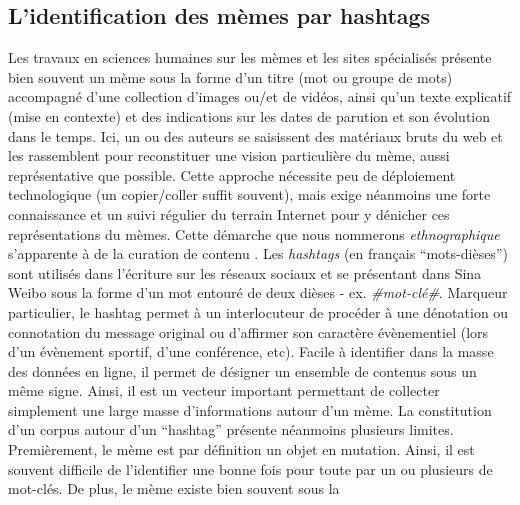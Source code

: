 \subsection[ L{\textquoteright}identification des m\`emes par hashtags ]{L{\textquoteright}identification des m\`emes par hashtags }
Les travaux en sciences humaines sur les m\`emes \citep{Bauckhage2011,
Coscia2013, Knobel2007} et les sites sp\'ecialis\'es \citep{Buchel2012, Bernstein2011} pr\'esente bien souvent un m\`eme sous la forme
d{\textquoteright}un titre (mot ou groupe de mots) accompagn\'e
d{\textquoteright}une collection d{\textquoteright}images ou/et de
vid\'eos, ainsi qu{\textquoteright}un texte explicatif (mise en
contexte) et des indications sur les dates de parution et son
\'evolution dans le temps. Ici, un ou des auteurs se saisissent des
mat\'eriaux bruts du web et les rassemblent pour reconstituer une
vision particuli\`ere du m\`eme, aussi repr\'esentative que possible.
Cette approche n\'ecessite peu de d\'eploiement technologique (un
copier/coller suffit souvent), mais exige n\'eanmoins une forte
connaissance et un suivi r\'egulier du terrain Internet pour y
d\'enicher ces repr\'esentations du m\`emes. Cette d\'emarche que nous
nommerons \textit{ethnographique }s{\textquoteright}apparente \`a de la
curation de contenu \citep{Buckingham2006}. Les \textit{hashtags }(en
fran\c{c}ais {\textquotedblleft}mots-di\`eses{\textquotedblright}) sont
utilis\'es dans l{\textquoteright}\'ecriture sur les r\'eseaux sociaux
et se pr\'esentant dans Sina Weibo sous la forme d{\textquoteright}un
mot entour\'e de deux di\`eses - ex. \textit{\#mot-cl\'e\#}. Marqueur
particulier, le hashtag permet \`a un interlocuteur de proc\'eder \`a
une d\'enotation ou connotation du message original \citep{Romero2011} ou
d{\textquoteright}affirmer son caract\`ere \'ev\`enementiel (lors
d{\textquoteright}un \'ev\`enement sportif, d{\textquoteright}une
conf\'erence, etc). Facile \`a identifier dans la masse des donn\'ees
en ligne, il permet de d\'esigner un ensemble de contenus sous un
m\^eme signe. Ainsi, il est un vecteur important permettant de
collecter simplement une large masse d{\textquoteright}informations
autour d{\textquoteright}un m\`eme. La constitution
d{\textquoteright}un corpus autour d{\textquoteright}un
{\textquotedblleft}hashtag{\textquotedblright} pr\'esente n\'eanmoins
plusieurs limites. Premi\`erement, le m\`eme est par d\'efinition un
objet en mutation. Ainsi, il est souvent difficile de
l{\textquoteright}identifier une bonne fois pour toute par un ou
plusieurs de mot-cl\'es. De plus, le m\`eme existe bien souvent sous la
